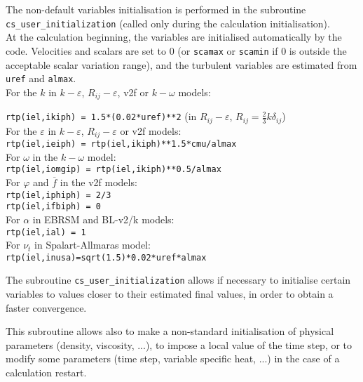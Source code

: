 {{The non-default variables initialisation is performed in the subroutine \texttt{cs\_user\_initialization} (called only during the calculation initialisation).\\ At the calculation beginning, the variables are initialised
automatically by the code. Velocities and scalars are set to 0 (or \texttt{scamax} or \texttt{scamin} if 0 is outside the acceptable
scalar variation range), and the turbulent variables are estimated from
\texttt{uref} and \texttt{almax}. \\
For the $k$ in $k-\varepsilon$, $R_{ij}-\varepsilon$, v2f or $k-\omega$
models:\\
{\texttt{rtp(iel,ikiph) = 1.5*(0.02*uref)**2}
(in $R_{ij}-\varepsilon$,  $R_{ij}=\frac{2}{3}k\delta_{ij}$)\\
For the $\varepsilon$ in $k-\varepsilon$, $R_{ij}-\varepsilon$ or v2f models:\\
\texttt{rtp(iel,ieiph) = rtp(iel,ikiph)**1.5*cmu/almax}\\
For $\omega$ in the $k-\omega$ model:\\
\texttt{rtp(iel,iomgip) = rtp(iel,ikiph)**0.5/almax}\\
For $\varphi$ and $\overline{f}$ in the v2f models:\\
\texttt{rtp(iel,iphiph) = 2/3}\\
\texttt{rtp(iel,ifbiph) = 0}\\
For $\alpha$ in EBRSM and BL-v2/k models:\\
\texttt{rtp(iel,ial) = 1}\\
For $\nu_t$ in Spalart-Allmaras model:\\
\texttt{rtp(iel,inusa)=sqrt(1.5)*0.02*uref*almax}

The subroutine \texttt{cs\_user\_initialization} allows if necessary to initialise certain
variables to values closer to their estimated final values, in order to
obtain a faster convergence.

This subroutine allows also to make a non-standard initialisation of
physical parameters (density, viscosity, ...), to impose a local
value of the time step, or to modify some parameters (time step,
variable specific heat, ...) in the case of a calculation restart.

}}}
